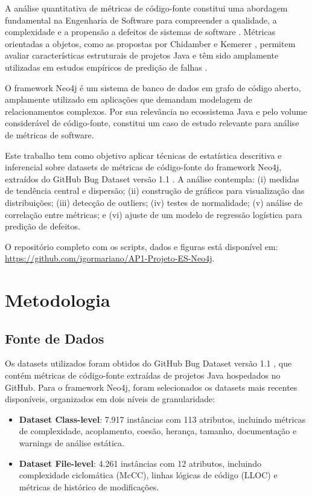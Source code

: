 \documentclass[12pt]{article}
\begin{document}
A análise quantitativa de métricas de código-fonte constitui uma abordagem fundamental na Engenharia de Software para compreender a qualidade, a complexidade e a propensão a defeitos de sistemas de software \cite{pressman2014}. Métricas orientadas a objetos, como as propostas por Chidamber e Kemerer \cite{chidamber1994}, permitem avaliar características estruturais de projetos Java e têm sido amplamente utilizadas em estudos empíricos de predição de falhas \cite{gyimothy2005, basili1996}.

O framework Neo4j é um sistema de banco de dados em grafo de código aberto, amplamente utilizado em aplicações que demandam modelagem de relacionamentos complexos. Por sua relevância no ecossistema Java e pelo volume considerável de código-fonte, constitui um caso de estudo relevante para análise de métricas de software.

Este trabalho tem como objetivo aplicar técnicas de estatística descritiva e inferencial sobre datasets de métricas de código-fonte do framework Neo4j, extraídos do GitHub Bug Dataset versão 1.1 \cite{toth2016}. A análise contempla: (i) medidas de tendência central e dispersão; (ii) construção de gráficos para visualização das distribuições; (iii) detecção de outliers; (iv) testes de normalidade; (v) análise de correlação entre métricas; e (vi) ajuste de um modelo de regressão logística para predição de defeitos.

O repositório completo com os scripts, dados e figuras está disponível em: \url{https://github.com/igormariano/AP1-Projeto-ES-Neo4j}.

\section{Metodologia} \label{sec:metodo}

\subsection{Fonte de Dados}

Os datasets utilizados foram obtidos do GitHub Bug Dataset versão 1.1 \cite{toth2016}, que contém métricas de código-fonte extraídas de projetos Java hospedados no GitHub. Para o framework Neo4j, foram selecionados os datasets mais recentes disponíveis, organizados em dois níveis de granularidade:

\begin{itemize}
  \item \textbf{Dataset Class-level}: 7.917 instâncias com 113 atributos, incluindo métricas de complexidade, acoplamento, coesão, herança, tamanho, documentação e warnings de análise estática.
  \item \textbf{Dataset File-level}: 4.261 instâncias com 12 atributos, incluindo complexidade ciclomática (McCC), linhas lógicas de código (LLOC) e métricas de histórico de modificações.
\end{itemize}
\end{document}

